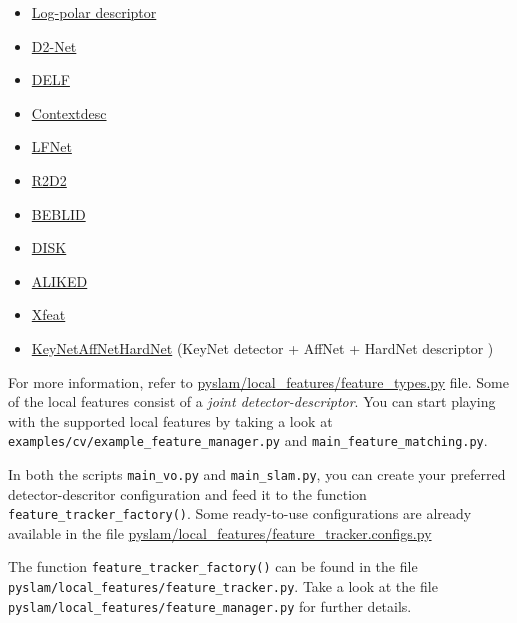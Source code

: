 \documentclass{article}
\begin{document}
\begin{itemize}
    \item \href{https://github.com/cvlab-epfl/log-polar-descriptors}{Log-polar descriptor} \cite{LogPolarDescriptor}
    \item \href{https://github.com/mihaidusmanu/d2-net}{D2-Net} \cite{dusmanu2019d2}
    \item \href{https://github.com/tensorflow/models/tree/master/research/delf}{DELF} \cite{noh2017large}
    \item \href{https://github.com/lzx551402/contextdesc}{Contextdesc} \cite{luo2020contextdesc}
    \item \href{https://github.com/vcg-uvic/lf-net-release}{LFNet} \cite{ono2018lf}
    \item \href{https://github.com/naver/r2d2}{R2D2} \cite{revaud2019r2d2}
    \item \href{https://raw.githubusercontent.com/iago-suarez/BEBLID/master/BEBLID_Boosted_Efficient_Binary_Local_Image_Descriptor.pdf}{BEBLID} \cite{BEBLID}
    \item \href{https://arxiv.org/abs/2006.13566}{DISK} \cite{tyszkiewicz2020disk}
    \item \href{https://arxiv.org/abs/2304.03608}{ALIKED} \cite{barroso2023alike}
    \item \href{https://arxiv.org/abs/2404.19174}{Xfeat} \cite{barroso2024xfeat}
    \item \href{https://github.com/axelBarroso/Key.Net}{KeyNetAffNetHardNet} (KeyNet detector \cite{barroso2020key} + AffNet + HardNet descriptor \cite{mishchuk2017working})
\end{itemize}

For more information, refer to \href{https://github.com/luigifreda/pyslam/blob/master/pyslam/local_features/feature_types.py}{pyslam/local\_features/feature\_types.py}
file. Some of the local features consist of a \emph{joint
detector-descriptor}. You can start playing with the supported local
features by taking a look at \texttt{examples/cv/example\_feature\_manager.py}
and \texttt{main\_feature\_matching.py}.

In both the scripts \texttt{main\_vo.py} and \texttt{main\_slam.py}, you
can create your preferred detector-descritor configuration and feed it
to the function \texttt{feature\_tracker\_factory()}. Some ready-to-use
configurations are already available in the file
\href{https://github.com/luigifreda/pyslam/blob/master/pyslam/local_features/feature_tracker_configs.py}{pyslam/local\_features/feature\_tracker.configs.py}

The function \texttt{feature\_tracker\_factory()} can be found in the
file \texttt{pyslam/local\_features/feature\_tracker.py}. Take a look at the
file \texttt{pyslam/local\_features/feature\_manager.py} for further details.
\end{document}
